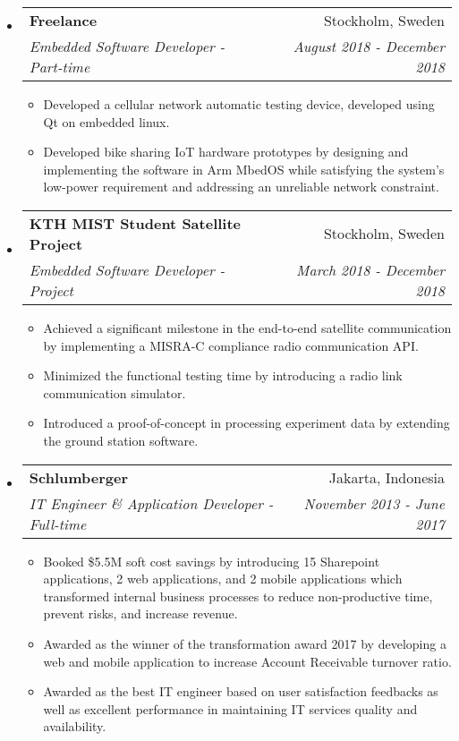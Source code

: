 \documentclass[letterpaper,9pt]{article}
\makeatletter
\newcommand{\resitem}[1]{\item #1 \vspace{-2pt}}
\newcommand{\ressubheading}[4]{
\begin{tabular*}{7.0in}{l@{\cftdotfill{\cftsecdotsep}\extracolsep{\fill}}r}
		\textbf{#1} & #2 \\
        \textit{#3} & \textit{#4} \\
\end{tabular*}\vspace{-6.3pt}}
\makeatother
\begin{document}
\begin{itemize}
  \item
        \ressubheading{Freelance}{Stockholm, Sweden}{Embedded Software Developer - Part-time}{August 2018 - December 2018}
        \begin{itemize}
          \resitem{Developed a cellular network automatic testing device, developed using Qt on embedded linux.}
          \resitem{Developed bike sharing IoT hardware prototypes by designing and implementing the software in Arm MbedOS while satisfying the system's low-power requirement and addressing an unreliable network constraint.}
        \end{itemize}

  \item
        \ressubheading{KTH MIST Student Satellite Project}{Stockholm, Sweden}{Embedded Software Developer - Project}{March 2018 - December 2018}
        \begin{itemize}
          \resitem{Achieved a significant milestone in the end-to-end satellite communication by implementing a MISRA-C compliance radio communication API.}
          \resitem{Minimized the functional testing time by introducing a radio link communication simulator.}
          \resitem{Introduced a proof-of-concept in processing experiment data by extending the ground station software.}
        \end{itemize}

  \item
        \ressubheading{Schlumberger}{Jakarta, Indonesia}{IT Engineer \& Application Developer - Full-time}{November 2013 - June 2017}
        \begin{itemize}
          \resitem{Booked \$5.5M soft cost savings by introducing 15 Sharepoint applications, 2 web applications, and 2 mobile applications which transformed internal business processes to reduce non-productive time, prevent risks, and increase revenue.}
          \resitem{Awarded as the winner of the transformation award 2017 by developing a web and mobile application to increase Account Receivable turnover ratio.}
          \resitem{Awarded as the best IT engineer based on user satisfaction feedbacks as well as excellent performance in maintaining IT services quality and availability.}
        \end{itemize}

\end{itemize} \vspace{-15pt}

\pagebreak

\end{document}
